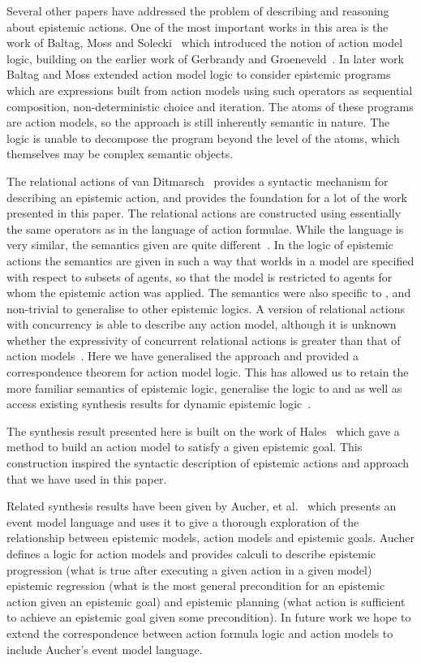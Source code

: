 Several other papers have addressed the problem of describing and reasoning about epistemic actions.
One of the most important works in this area is the work of Baltag, Moss and Solecki~\cite{baltag:1998} which introduced the notion of action model logic, building on the earlier work of Gerbrandy and Groeneveld~\cite{gerbrandy:1997}.
In later work Baltag and Moss extended action model logic to consider epistemic programs~\cite{baltag:2004} which are expressions built from action models using such operators as sequential composition, non-deterministic choice and iteration.
The atoms of these programs are action models, so the approach is still inherently semantic in nature.
The logic is unable to decompose the program beyond the level of the atoms, which themselves may be complex semantic objects.

The relational actions of van Ditmarsch~\cite{vanditmarsch:2000} provides a syntactic mechanism for describing an epistemic action, and provides the foundation for a lot of the work presented in this paper.
The relational actions are constructed using essentially the same operators as in the language of action formulae.
While the language is very similar, the semantics given are quite different~\cite{vanditmarsch:2007}.
In the logic of epistemic actions the semantics are given in such a way that worlds in a model are specified with respect to subsets of agents, so that the model is restricted to agents for whom the epistemic action was applied.
The semantics were also specific to \classS{}, and non-trivial to generalise to other epistemic logics.
A version of relational actions with concurrency is able to describe any \classS{} action model, although it is unknown whether the expressivity of concurrent relational actions is greater than that of action models~\cite{baltag:2006}.
Here we have generalised the approach and provided a correspondence theorem for action model logic.
This has allowed us to retain the more familiar semantics of epistemic logic, generalise the logic to \classK{} and \classKFF{} as well as access existing synthesis results for dynamic epistemic logic~\cite{hales:2013}.

The synthesis result presented here is built on the work of Hales~\cite{hales:2013} which gave a method to build an action model to satisfy a given epistemic goal.
This construction inspired the syntactic description of epistemic actions and approach that we have used in this paper.

Related synthesis results have been given by Aucher, et al.~\cite{aucher:2011,aucher:2012,aucher:2013} which presents an event model language and uses it to give a thorough exploration of the relationship between epistemic models, action models and epistemic goals.
Aucher defines a logic for action models and provides calculi to describe epistemic progression (what is true after executing a given action in a given model) epistemic regression (what is the most general precondition for an epistemic action given an epistemic goal) and epistemic planning (what action is sufficient to achieve an epistemic goal given some precondition).
In future work we hope to extend the correspondence between action formula logic and action models to include Aucher's event model language.
